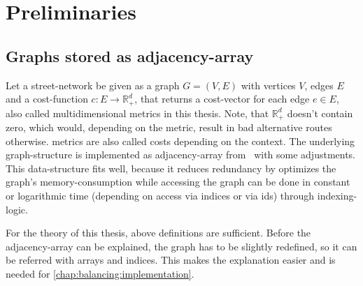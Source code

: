 \chapter{Preliminaries}
\label{chap:preliminaries}


\section{Graphs stored as adjacency-array}
\label{chap:preliminaries:graphs}


    Let a street-network be given as a graph $G = (V, E)$ with vertices $V$, edges $E$ and a cost-function $c: E \to \mathbb{R}_+^d$, that returns a cost-vector for each edge $e \in E$, also called multidimensional \glspl{metric} in this thesis.
    Note, that $\mathbb{R}_+^d$ doesn't contain zero, which would, depending on the \gls{metric}, result in bad alternative routes otherwise.
    \Glspl{metric} are also called \glspl{cost} depending on the context.
    The underlying graph-structure is implemented as adjacency-array from~\cite{mehlhorn:algorithms} with some adjustments.
    This data-structure fits well, because it reduces redundancy by optimizes the graph's memory-consumption while accessing the graph can be done in constant or logarithmic time (depending on access via indices or via ids) through indexing-logic.

    For the theory of this thesis, above definitions are sufficient.
    Before the adjacency-array can be explained, the graph has to be slightly redefined, so it can be referred with arrays and indices.
    This makes the explanation easier and is needed for \cref{chap:balancing:implementation}.

